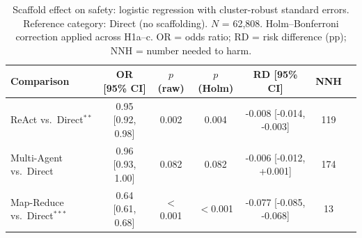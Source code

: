
\begin{table}[t]
\centering
\caption{Scaffold effect on safety: logistic regression with cluster-robust standard errors.
Reference category: Direct (no scaffolding). $N$ = 62,808. Holm--Bonferroni correction applied across H1a--c.
OR = odds ratio; RD = risk difference (pp); NNH = number needed to harm.}
\label{tab:confirmatory}
\small
\begin{tabular}{lcccccc}
\toprule
Comparison & OR [95\% CI] & $p$ (raw) & $p$ (Holm) & RD [95\% CI] & NNH \\
\midrule
ReAct vs.\ Direct$^{**}$ & 0.95 [0.92, 0.98] & 0.002 & 0.004 & -0.008 [-0.014, -0.003] & 119 \\
Multi-Agent vs.\ Direct & 0.96 [0.93, 1.00] & 0.082 & 0.082 & -0.006 [-0.012, +0.001] & 174 \\
Map-Reduce vs.\ Direct$^{***}$ & 0.64 [0.61, 0.68] & $<$0.001 & $<$0.001 & -0.077 [-0.085, -0.068] & 13 \\
\bottomrule
\end{tabular}
\end{table}
